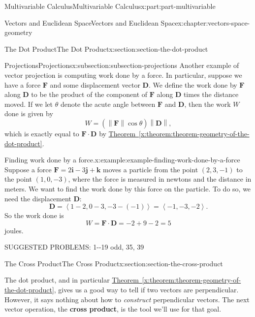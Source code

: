 \documentclass[twoside,10pt,]{book}
\newcommand{\xreffont}{\relax}
\newcommand{\terminology}[1]{\textbf{#1}}
\numberwithin{equation}{part}
\newcommand{\norm}[1]{\left\| #1 \right\|}
\newcommand{\dotprod}[1]{\left\langle #1 \right\rangle}
\begin{document}
\begin{partptx}{Multivariable Calculus}{}{Multivariable Calculus}{}{}{x:part:part-multivariable}
\begin{chapterptx}{Vectors and Euclidean Space}{}{Vectors and Euclidean Space}{}{}{x:chapter:vectors-space-geometry}
\begin{sectionptx}{The Dot Product}{}{The Dot Product}{}{}{x:section:section-the-dot-product}
\begin{subsectionptx}{Projections}{}{Projections}{}{}{x:subsection:subsection-projections}
Another example of vector projection is computing work done by a force. In particular, suppose we have a force \(\mathbf{F}\) and some displacement vector \(\mathbf{D}\). We define the work done by \(\mathbf{F}\) along \(\mathbf{D}\) to be the product of the component of \(\mathbf{F}\) along \(\mathbf{D}\) times the distance moved. If we let \(\theta\) denote the acute angle between \(\mathbf{F}\) and \(\mathbf{D}\), then the work \(W\) done is given by%
%
\begin{equation*}
W = (\norm{\mathbf{F}}\cos\theta)\norm{\mathbf{D}},
\end{equation*}
which is exactly equal to \(\mathbf{F}\cdot\mathbf{D}\) by \hyperref[x:theorem:theorem-geometry-of-the-dot-product]{Theorem~{\xreffont\ref{x:theorem:theorem-geometry-of-the-dot-product}}}.%
\begin{example}{Finding work done by a force.}{x:example:example-finding-work-done-by-a-force}%
Suppose a force \(\mathbf{F} = 2\mathbf{i}-3\mathbf{j}+\mathbf{k}\) moves a particle from the point \((2,3,-1)\) to the point \((1,0,-3)\), where the force is measured in newtons and the distance in meters. We want to find the work done by this force on the particle. To do so, we need the displacement \(\mathbf{D}\):%
%
\begin{equation*}
\mathbf{D} = \dotprod{1-2,0-3,-3-(-1)} = \dotprod{-1,-3,-2}.
\end{equation*}
So the work done is%
%
\begin{equation*}
W = \mathbf{F}\cdot\mathbf{D} = -2+9-2 = 5
\end{equation*}
joules.%
\end{example}
SUGGESTED PROBLEMS: 1-{}-{}19 odd, 35, 39%
\end{subsectionptx}
\end{sectionptx}
%
%
\typeout{************************************************}
\typeout{************************************************}
%
\begin{sectionptx}{The Cross Product}{}{The Cross Product}{}{}{x:section:section-the-cross-product}
\begin{introduction}{}%
The dot product, and in particular \hyperref[x:theorem:theorem-geometry-of-the-dot-product]{Theorem~{\xreffont\ref{x:theorem:theorem-geometry-of-the-dot-product}}}, gives us a good way to tell if two vectors are perpendicular. However, it says nothing about how to \emph{construct} perpendicular vectors. The next vector operation, the \terminology{cross product}, is the tool we'll use for that goal.%

\end{introduction}
\end{sectionptx}
\end{chapterptx}
\end{partptx}
\end{document}
